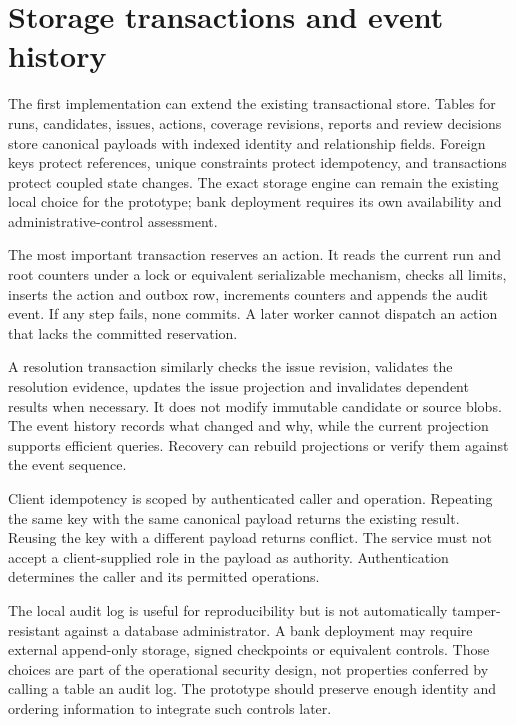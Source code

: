 \section{Storage transactions and event history}
\label{merge:M08:06}


The first implementation can extend the existing transactional store. Tables for
runs, candidates, issues, actions, coverage revisions, reports and review decisions
store canonical payloads with indexed identity and relationship fields. Foreign
keys protect references, unique constraints protect idempotency, and transactions
protect coupled state changes. The exact storage engine can remain the existing
local choice for the prototype; bank deployment requires its own availability and
administrative-control assessment.

The most important transaction reserves an action. It reads the current run and
root counters under a lock or equivalent serializable mechanism, checks all
limits, inserts the action and outbox row, increments counters and appends the
audit event. If any step fails, none commits. A later worker cannot dispatch an
action that lacks the committed reservation.

A resolution transaction similarly checks the issue revision, validates the
resolution evidence, updates the issue projection and invalidates dependent
results when necessary. It does not modify immutable candidate or source blobs.
The event history records what changed and why, while the current projection
supports efficient queries. Recovery can rebuild projections or verify them
against the event sequence.

Client idempotency is scoped by authenticated caller and operation. Repeating the
same key with the same canonical payload returns the existing result. Reusing the
key with a different payload returns conflict. The service must not accept a
client-supplied role in the payload as authority. Authentication determines the
caller and its permitted operations.

The local audit log is useful for reproducibility but is not automatically
 tamper-resistant against a database administrator. A bank deployment may require
external append-only storage, signed checkpoints or equivalent controls. Those
choices are part of the operational security design, not properties conferred by
calling a table an audit log. The prototype should preserve enough identity and
ordering information to integrate such controls later.

